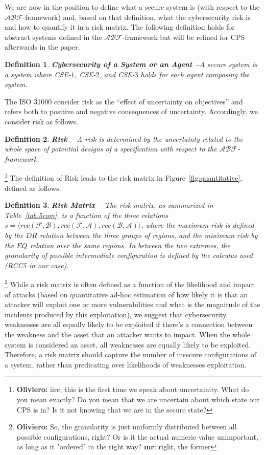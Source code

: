 \documentclass[conference]{IEEEtran}
\newcommand{\fixnote}[2]{\textbf{\color{red}{FIX}}\footnote{{\bf #1:} #2}}
\newcommand{\fix}[2]{{\color{red}{\bf tofix:} #2}}
\newcommand{\assertionRegion}{\mathcal{A}}
\newcommand{\beliefRegion}{\mathcal{B}}
\newcommand{\factRegion}{\mathcal{F}}
\newcommand{\rcc}{rcc}
\newcommand{\abftheory}{\assertionRegion\beliefRegion\factRegion}
\newtheorem{definition}{Definition}%
\begin{document}
We are now in the position to define what a secure system is (with respect to
the $\abftheory$-framework) and, based on that definition, what the cybersecurity risk is and
how to quantify it in a risk matrix. The following definition holds for 
abstract systems defined in the $\abftheory$-framework but will be refined
for CPS afterwards in the paper.
\begin{definition}{\bf Cybersecurity of a System or an Agent --}\label{def:security}
	A secure system is a system where CSE-$1$, CSE-$2$, and CSE-$3$ holds for
	each agent composing the system.
\end{definition}
The ISO 31000 consider risk as the ``effect of uncertainty on objectives'' and
refers both to positive and negative consequences of uncertainty.
Accordingly, we consider risk as follows.
\begin{definition}{\bf Risk --}
	\fix{mr}{A risk is determined by the uncertainty related to the whole space of potential designs of a specification with respect to the
	$\abftheory$-framework.}
\end{definition}\fixnote{Oliviero}{iirc, this is the first time we speak about uncertainity. What do you mean exactly? Do you mean that we are uncertain about which state our CPS is in? Is it not knowing that we are in the secure state?}
The definition of Risk leads to the risk matrix in
Figure~\ref{fig:quantitative}, defined as follows.
\begin{definition}{\bf Risk Matrix --}
	The risk matrix, as summarized in Table~\ref{tab:5com}, is a function of the three relations
	$s=\langle\rcc(\factRegion,\beliefRegion),\rcc(\factRegion,\assertionRegion),\rcc(\beliefRegion,\assertionRegion)\rangle$,
	where the maximum risk is defined by the $DR$ relation between the
	three groups of regions, and the minimum risk by the $EQ$ relation over
	the same regions. In between the two extremes, the granularity of
	possible intermediate configuration is defined by the calculus used
	(RCC5 in our case).
\end{definition}\fixnote{Oliviero}{So, the granularity is just uniformly distributed between all possible configurations, right? Or is it the actual numeric value unimportant, as long as it "ordered" in the right way? {\bf mr}: right, the former}
While a risk matrix is often defined as a function of the likelihood and impact
of attacks (based on quantitative ad-hoc estimation of how likely it is that an
attacker will exploit one or more vulnerabilities and what is the magnitude of
the incidents produced by this exploitation), we suggest that cybersecurity
weaknesses are all equally likely to be exploited if there's a connection
between the weakness and the asset that an attacker wants to impact. When the
whole system is considered an asset, all weaknesses are equally likely to be
exploited.  Therefore, a risk matrix should capture the number of insecure
configurations of a system, rather than predicating over likelihoods of
weaknesses exploitation.
\end{document}
